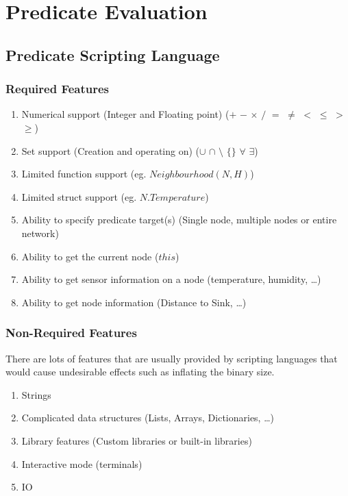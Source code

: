 \section{Predicate Evaluation}

\subsection{Predicate Scripting Language}

\subsubsection{Required Features}

\begin{enumerate}
	\item Numerical support (Integer and Floating point) ($+$ $-$ $\times$ $/$ $=$ $\neq$ $<$ $\leq$ $>$ $\geq$)
	\item Set support (Creation and operating on) ($\cup$ $\cap$ $\setminus$ $\{\}$ $\forall$ $\exists$)
	\item Limited function support (eg. $Neighbourhood(N, H)$)
	\item Limited struct support (eg. $N.Temperature$)
	\item Ability to specify predicate target(s) (Single node, multiple nodes or entire network)
	\item Ability to get the current node ($this$)
	\item Ability to get sensor information on a node (temperature, humidity, \ldots)
	\item Ability to get node information (Distance to Sink, \ldots)
\end{enumerate}

\subsubsection{Non-Required Features}

There are lots of features that are usually provided by scripting languages that would cause undesirable effects such as inflating the binary size.

\begin{enumerate}
	\item Strings
	\item Complicated data structures (Lists, Arrays, Dictionaries, \ldots)
	\item Library features (Custom libraries or built-in libraries)
	\item Interactive mode (terminals)
	\item IO
\end{enumerate}



